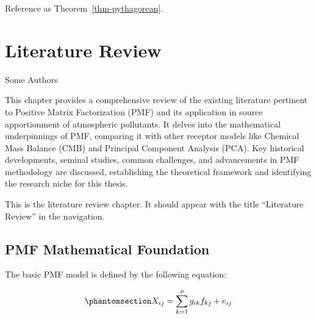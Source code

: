 \documentclass[
  letterpaper,
  oneside,
  openany]{MastersDoctoralThesis}
\theoremstyle{plain}
\theoremstyle{remark}
\begin{document}
Reference as Theorem~\ref{thm-pythagorean}.


\chapter{Literature Review}\label{sec-ch1-literature}

\begin{center}
Some Authors

\end{center}

\begin{tcolorbox}[enhanced jigsaw, opacityback=0, opacitybacktitle=0.6, left=2mm, breakable, coltitle=black, colback=white, title=\textcolor{quarto-callout-important-color}{\faExclamation}\hspace{0.5em}{Chapter Summary}, colframe=quarto-callout-important-color-frame, colbacktitle=quarto-callout-important-color!10!white, rightrule=.15mm, bottomtitle=1mm, leftrule=.75mm, toptitle=1mm, bottomrule=.15mm, arc=.35mm, toprule=.15mm, titlerule=0mm]

This chapter provides a comprehensive review of the existing literature
pertinent to Positive Matrix Factorization (PMF) and its application in
source apportionment of atmospheric pollutants. It delves into the
mathematical underpinnings of PMF, comparing it with other receptor
models like Chemical Mass Balance (CMB) and Principal Component Analysis
(PCA). Key historical developments, seminal studies, common challenges,
and advancements in PMF methodology are discussed, establishing the
theoretical framework and identifying the research niche for this
thesis.

\end{tcolorbox}

This is the literature review chapter. It should appear with the title
``Literature Review'' in the navigation.

\section{PMF Mathematical Foundation}\label{sec-ch1-pmf-math}

The basic PMF model is defined by the following equation:

\begin{equation}\phantomsection\label{eq-pmf-basic}{X_{ij} = \sum_{k=1}^{p} g_{ik}f_{kj} + e_{ij}}\end{equation}
\end{document}
